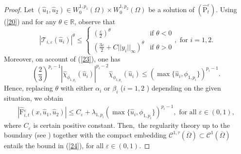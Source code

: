 \documentclass[11pt]{amsart}
\theoremstyle{definition}
\theoremstyle{remark}
\numberwithin{equation}{section}
\begin{document}
\begin{proof}
Let $(\hat{u}_{1},\hat{u}_{2})\in W_{0}^{1,p_{1}}(\Omega )\times
W_{0}^{1,p_{2}}(\Omega )$ be a solution of $(\widehat{\mathrm{P}}
_{t}^{\varepsilon })$. Using (\ref{20}) and for any $\theta \in 
\mathbb{R}
$, observe that 
\begin{equation*}
|\mathcal{T}_{i,\varepsilon }(\hat{u}_{i})|^{\theta }\leq \left\{ 
\begin{array}{ll}
(\frac{\varepsilon }{2})^{\theta } & \text{if }\theta <0 \\ 
(\frac{3\varepsilon }{2}+C||y_{i}||_{\infty })^{\theta } & \text{if }\theta
>0%
\end{array}
\right. ,\text{ for }i=1,2.
\end{equation*}
Moreover, on account of (\ref{23}), one has 
\begin{equation*}
(\frac{2}{3})^{p_{i}-1}|\hat{\chi}_{\phi _{1,p_{i}}}(\hat{u}_{i})|^{p_{i}-2} 
\hat{\chi}_{\phi _{1,p_{i}}}(\hat{u}_{i})\leq (\max \{\hat{u}_{i},\phi
_{1,p_{i}}\})^{p_{i}-1}.
\end{equation*}
Hence, replacing $\theta $ with either $\alpha _{i}$ or $\beta _{i}$ ($i=1,2$
) depending on the given situation, we obtain 
\begin{equation*}
\begin{array}{l}
|\widehat{\mathrm{F}}{_{i,t}^{\varepsilon }}({x,}\hat{u}_{1},\hat{u}
_{2})|\leq C_{\varepsilon }+\lambda _{1,p_{i}}(\max \{\hat{u}_{i},\phi
_{1,p_{i}}\})^{p_{i}-1},\text{ for all }\varepsilon \in (0,1),%
\end{array}%
\end{equation*}
where $C_{\varepsilon }$ is certain positive constant. Then,\ the regularity
theory up to the boundary (see \cite[Corollary 8.13]{MMP2}) together with
the compact embedding $\mathcal{C}^{1,\tau }(\overline{\Omega })\subset 
\mathcal{C}^{1}(\overline{\Omega })$ entails the bound in (\ref{24}), for
all $\varepsilon \in (0,1)$.


\end{proof}
\end{document}
